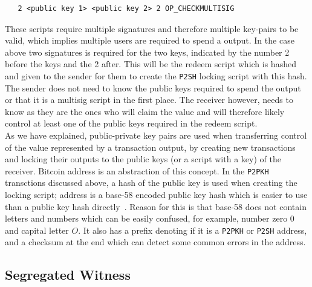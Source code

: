 \begin{verbatim}
   2 <public key 1> <public key 2> 2 OP_CHECKMULTISIG
\end{verbatim}

These scripts require multiple signatures and therefore multiple key-pairs to be valid, which implies multiple users are required to spend a output.
In the case above two signatures is required for the two keys, indicated by the number 2 before the keys and the 2 after.
This will be the redeem script which is hashed and given to the sender for them to create the {\tt P2SH} locking script with this hash.
The sender does not need to know the public keys required to spend the output or that it is a multisig script in the first place. The receiver however, needs to know as they are the ones who will claim the value and will therefore likely control at least one of the public keys required in the redeem script.
\\

As we have explained, public-private key pairs are used when transferring  control of the value represented by a transaction output, by creating new transactions and locking their outputs to the public keys (or a script with a key) of the receiver. Bitcoin address is an abstraction of this concept. In the {\tt P2PKH} transctions discussed above, a hash of the public key is used when creating the locking script; address is a base-58 encoded public key hash which is easier to use than a public key hash directly~\cite{antonopoulos2017mastering}. Reason for this is that base-58 does not contain letters and numbers which can be easily confused, for example, number zero $0$ and capital letter $O$. It also has a prefix denoting if it is a {\tt P2PKH} or {\tt P2SH} address, and a checksum at the end which can detect some common errors in the address.

\subsection{Segregated Witness}
\label{subsec:segwit}


